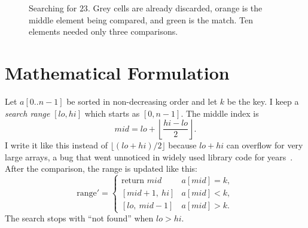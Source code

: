 \documentclass[11pt,a4paper]{article}
\newif\ifshowguidance
\newcommand{\guidance}[1]{\ifshowguidance\begin{guidancebox}#1\end{guidancebox}\fi}
\begin{document}
\begin{figure}[h]
\centering
{}
\caption{Searching for $23$. Grey cells are already discarded, orange is the middle
element being compared, and green is the match. Ten elements needed only three
comparisons.}
\label{fig:idea}
\end{figure}

\section{Mathematical Formulation}
\guidance{Define symbols, number equations, give recurrence and bound.}

Let $a[0..n-1]$ be sorted in non-decreasing order and let $k$ be the key. I keep a
\emph{search range} $[\mathit{lo},\mathit{hi}]$ which starts as $[0,n-1]$. The
middle index is
\begin{equation}
\mathit{mid} = \mathit{lo} + \left\lfloor \frac{\mathit{hi}-\mathit{lo}}{2} \right\rfloor .
\label{eq:mid}
\end{equation}
I write it like this instead of $\lfloor(\mathit{lo}+\mathit{hi})/2\rfloor$ because
$\mathit{lo}+\mathit{hi}$ can overflow for very large arrays, a bug that went
unnoticed in widely used library code for years~\cite{bloch2006}. After the
comparison, the range is updated like this:
\begin{equation}
\text{range}' =
\begin{cases}
\text{return } \mathit{mid} & a[\mathit{mid}] = k,\\
[\mathit{mid}+1,\ \mathit{hi}] & a[\mathit{mid}] < k,\\
[\mathit{lo},\ \mathit{mid}-1] & a[\mathit{mid}] > k.
\end{cases}
\label{eq:update}
\end{equation}
The search stops with ``not found'' when $\mathit{lo}>\mathit{hi}$.
\end{document}
